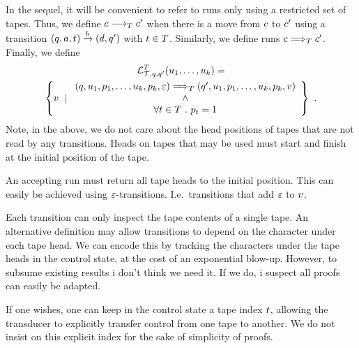 In the sequel, it will be convenient to refer to runs only using a restricted set of tapes.
Thus, we define
$c \longrightarrow_{T} c'$
when there is a move from $c$ to $c'$ using a transition
$\left(q,a,t\right) \xrightarrow{b} \left(d,q'\right)$
with $t \in T$.
Similarly, we define runs
$c \Longrightarrow_{T} c'$.
Finally, we define
\begin{multline*}
    \tlangofidx{\ducer}
               {\tstate}
               {\tstate'}
               {\tidxs}
               {\iword_1, \ldots, \iword_\numtapes}
    = \\
    \setcomp{\oword}{\begin{array}{c}
        \tup{
            \tstate,
            \iword_1, \tapepos_1,
            \ldots,
            \iword_\numtapes, \tapepos_\numtapes,
            \varepsilon
        }
        \trunidx{\tidxs}
        \tup{
            \tstate',
            \iword_1, \tapepos_1,
            \ldots,
            \iword_\numtapes, \tapepos_\numtapes,
            \oword
        }
        \\ \land \\
        \forall \tidx \in \tidxs\ .\ %
            \tapepos_\tidx = 1
    \end{array}} \ .
\end{multline*}
Note, in the above, we do not care about the head positions of tapes that are not read by any transitions.
Heads on tapes that may be used must start and finish at the initial position of the tape.


\begin{remark}
    An accepting run must return all tape heads to the initial position.
    This can easily be achieved using $\varepsilon$-transitions.
    I.e.~transitions that add $\varepsilon$ to $v$.
\end{remark}

\begin{remark}
    Each transition can only inspect the tape contents of a single tape.
    An alternative definition may allow transitions to depend on the character under each tape head.
    We can encode this by tracking the characters under the tape heads in the control state, at the cost of an exponential blow-up.
    However, to subsume existing results i don't think we need it.
    If we do, i suspect all proofs can easily be adapted.
\end{remark}

\begin{remark}
    If one wishes, one can keep in the control state a tape index $t$, allowing the transducer to explicitly transfer control from one tape to another.
    We do not insist on this explicit index for the sake of simplicity of proofs.
\end{remark}


